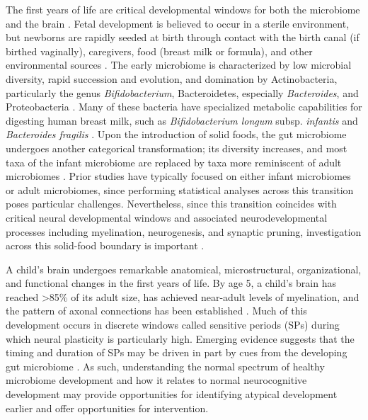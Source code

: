 \documentclass{article}
\begin{document}
The first years of life are critical developmental windows for both the
microbiome and the brain
\cite{laueDevelopingMicrobiomeBirth2022}.
Fetal development is believed to occur in a sterile environment, but newborns
are rapidly seeded at birth through contact with the birth canal (if
birthed vaginally), caregivers, food (breast milk or formula),
and other environmental sources
\cite{backhedDynamicsStabilizationHuman2015,bokulichAntibioticsBirthMode2016}.
The early microbiome is characterized by low microbial
diversity, rapid succession and evolution, and domination by
Actinobacteria, particularly the genus \emph{Bifidobacterium},
Bacteroidetes, especially \emph{Bacteroides}, and Proteobacteria
\cite{koenigSuccessionMicrobialConsortia2011}.
Many of these bacteria have specialized metabolic capabilities
for digesting human breast milk, such as \emph{Bifidobacterium longum}
subsp. \textit{infantis} and \emph{Bacteroides fragilis}
\cite{selaGenomeSequenceBifidobacterium2008}.
Upon the introduction of solid foods, the gut
microbiome undergoes another categorical transformation;
its diversity increases, and most taxa of the infant microbiome
are replaced by taxa more reminiscent of adult microbiomes
\cite{backhedDynamicsStabilizationHuman2015}.
Prior studies have typically focused on either infant microbiomes or
adult microbiomes, since performing statistical analyses across this
transition poses particular challenges. Nevertheless, since this
transition coincides with critical neural developmental windows and
associated neurodevelopmental processes including myelination, neurogenesis, and synaptic pruning,
investigation across this solid-food boundary is important
\cite{tauNormalDevelopmentBrain2010}.

A child's brain undergoes remarkable anatomical, microstructural,
organizational, and functional changes in the first years of life. By
age 5, a child's brain has reached \textgreater85\% of its adult size,
has achieved near-adult levels of myelination, and the pattern of axonal
connections has been established
\cite{silbereisCellularMolecularLandscapes2016}.
Much of this development occurs in discrete windows called
sensitive periods (SPs)
\cite{knudsenSensitivePeriodsDevelopment2004}
during which neural plasticity is particularly high.
Emerging evidence suggests that the timing and duration of SPs
may be driven in part by cues from the developing gut microbiome
\cite{callaghanNestedSensitivePeriods2020,cowanAnnualResearchReview2020}.
As such, understanding the normal spectrum of healthy microbiome
development and how it relates to normal neurocognitive development may
provide opportunities for identifying atypical development earlier and
offer opportunities for intervention.
\end{document}
